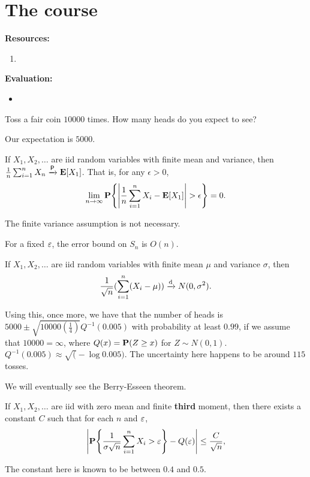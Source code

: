 \chapter*{The course}

\textbf{Resources:}
\begin{enumerate}
    \item
\end{enumerate}
\vspace{1em}
\textbf{Evaluation:}
\begin{itemize}
    \item
\end{itemize}

\begin{question}
    Toss a fair coin $10000$ times.
    How many heads do you expect to see?
\end{question}
Our expectation is $5000$.

\begin{theorem*} \label{thm:wlln}
    If $X_1, X_2, \dots$ are iid random variables with finite mean and
    variance, then $\frac1n \sum_{i=1}^n X_n \pto \E[X_1]$.
    That is, for any $\epsilon > 0$, \[
        \lim_{n \to \infty}
            \P\set*{\abs*{\frac1n \sum_{i=1}^n X_i - \E[X_1]} > \epsilon} = 0.
    \]
\end{theorem*}
The finite variance assumption is not necessary.

For a fixed $\eps$, the error bound on $S_n$ is $O(n)$.

\begin{theorem} \label{thm:clt}
    If $X_1, X_2, \dots$ are iid random variables with finite mean $\mu$
    and variance $\sigma$, then \[
        \frac1{\sqrt n} (\sum_{i=1}^n (X_i - \mu)) \dto N(0, \sigma^2).
    \]
\end{theorem}
Using this, once more, we have that the number of heads is
$5000 \pm \sqrt{10000 (\frac14)} Q^{-1}(0.005)$ with probability
at least $0.99$, if we assume that $10000 = \infty$,
where $Q(x) = \P(Z \ge x)$ for $Z \sim N(0, 1)$.
$Q^{-1}(0.005) \approx \sqrt(-\log 0.005)$.
The uncertainty here happens to be around $115$ tosses.

We will eventually see the Berry-Esseen theorem.
\begin{theorem} \label{thm:berry}
    If $X_1, X_2, \dots$ are iid with zero mean and finite \textbf{third}
    moment, then there exists a constant $C$ such that for each
    $n$ and $\eps$, \[
        \abs*{\P \set*{\frac1{\sigma \sqrt n} \sum_{i=1}^n X_i > \eps}
            - Q(\eps)} \le \frac{C}{\sqrt n},
    \]
\end{theorem}
The constant here is known to be between $0.4$ and $0.5$.

